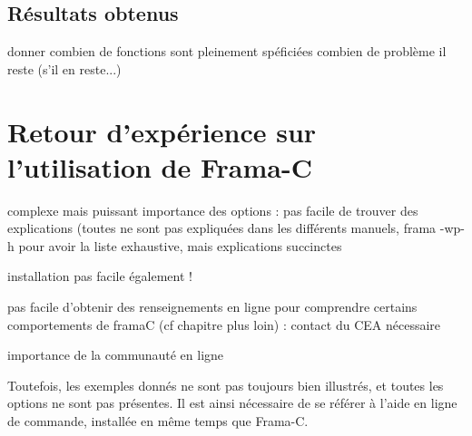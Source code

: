 \subsection{Résultats obtenus}

donner combien de fonctions sont pleinement spéficiées
combien de problème il reste (s'il en reste...)


\section{Retour d'expérience sur l'utilisation de Frama-C}

complexe mais puissant
importance des options : pas facile de trouver des explications (toutes ne sont pas expliquées dans les différents manuels, frama -wp-h pour avoir la liste exhaustive, mais explications succinctes

installation pas facile également !

pas facile d'obtenir des renseignements en ligne pour comprendre certains comportements de framaC (cf chapitre plus loin) : contact du CEA nécessaire

importance de la communauté en ligne

Toutefois, les exemples donnés ne sont pas toujours bien illustrés, et toutes les options ne sont pas présentes. Il est ainsi nécessaire de se référer à l'aide en ligne de commande, installée en même temps que Frama-C.